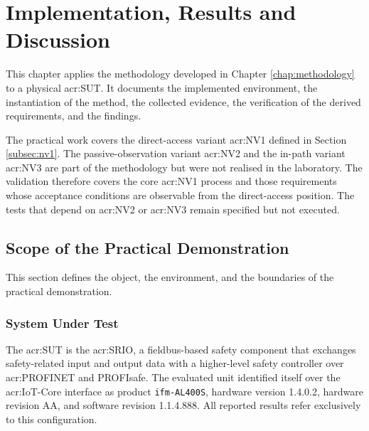 \chapter{Implementation, Results and Discussion} 
\label{chap:implementation_results} 

This chapter applies the methodology developed in  Chapter \ref{chap:methodology} to a physical \gls{acr:SUT}. It documents the implemented environment, the instantiation of the method, the collected evidence, the verification of the derived requirements, and the findings.

The practical work covers the direct-access variant \gls{acr:NV1} defined in Section \ref{subsec:nv1}. The passive-observation variant \gls{acr:NV2} and the in-path variant \gls{acr:NV3} are part of the methodology but were not realised in the laboratory. The validation therefore covers the core \gls{acr:NV1} process and those requirements whose acceptance conditions are observable from the direct-access position. The tests that depend on \gls{acr:NV2} or \gls{acr:NV3} remain specified but not executed.



\section{Scope of the Practical Demonstration}
\label{sec:testbed_setup} 

This section defines the object, the environment, and the boundaries of the practical demonstration.

\subsection{System Under Test} 
\label{subsec:test_object} 

The \gls{acr:SUT} is the \gls{acr:SRIO}, a fieldbus-based safety component that exchanges safety-related input and output data with a higher-level safety controller over \gls{acr:PROFINET} and PROFIsafe. The evaluated unit identified itself over the \gls{acr:IoT}-Core interface as product \texttt{ifm-AL400S}, hardware version 1.4.0.2, hardware revision AA, and software revision 1.1.4.888. All reported results refer exclusively to this configuration.

